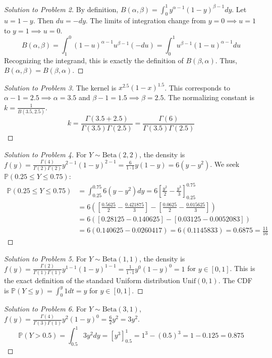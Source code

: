 \documentclass[11pt, a4paper]{article}
\theoremstyle{definition}
\theoremstyle{remark}
\newcommand{\Prob}{\mathbb{P}}
\begin{document}
\begin{proof}[Solution to Problem 2]
By definition, $B(\alpha, \beta) = \int_0^1 y^{\alpha-1} (1-y)^{\beta-1} dy$.
Let $u = 1 - y$. Then $du = -dy$. The limits of integration change from $y=0 \implies u=1$ to $y=1 \implies u=0$.
\[
B(\alpha, \beta) = \int_1^0 (1-u)^{\alpha-1} u^{\beta-1} (-du) = \int_0^1 u^{\beta-1} (1-u)^{\alpha-1} du
\]
Recognizing the integrand, this is exactly the definition of $B(\beta, \alpha)$. Thus, $B(\alpha, \beta) = B(\beta, \alpha)$.
\end{proof}

\begin{proof}[Solution to Problem 3]
The kernel is $x^{2.5} (1-x)^{1.5}$. This corresponds to $\alpha - 1 = 2.5 \implies \alpha = 3.5$ and $\beta - 1 = 1.5 \implies \beta = 2.5$.
The normalizing constant is $k = \frac{1}{B(3.5, 2.5)}$.
\[
k = \frac{\Gamma(3.5 + 2.5)}{\Gamma(3.5)\Gamma(2.5)} = \frac{\Gamma(6)}{\Gamma(3.5)\Gamma(2.5)}
\]
\end{proof}

\begin{proof}[Solution to Problem 4]
For $Y \sim \text{Beta}(2, 2)$, the density is $f(y) = \frac{\Gamma(4)}{\Gamma(2)\Gamma(2)} y^{2-1}(1-y)^{2-1} = \frac{6}{1 \cdot 1} y(1-y) = 6(y - y^2)$.
We seek $\Prob(0.25 \le Y \le 0.75)$:
\begin{align*}
\Prob(0.25 \le Y \le 0.75) &= \int_{0.25}^{0.75} 6(y - y^2) dy = 6 \left[ \frac{y^2}{2} - \frac{y^3}{3} \right]_{0.25}^{0.75} \\
&= 6 \left( \left[ \frac{0.5625}{2} - \frac{0.421875}{3} \right] - \left[ \frac{0.0625}{2} - \frac{0.015625}{3} \right] \right) \\
&= 6 \left( [0.28125 - 0.140625] - [0.03125 - 0.0052083] \right) \\
&= 6 (0.140625 - 0.0260417) = 6 (0.1145833) = 0.6875 = \frac{11}{16}
\end{align*}
\end{proof}

\begin{proof}[Solution to Problem 5]
For $Y \sim \text{Beta}(1, 1)$, the density is $f(y) = \frac{\Gamma(2)}{\Gamma(1)\Gamma(1)} y^{1-1}(1-y)^{1-1} = \frac{1}{1 \cdot 1} y^0 (1-y)^0 = 1$ for $y \in [0, 1]$.
This is the exact definition of the standard Uniform distribution $\text{Unif}(0, 1)$.
The CDF is $\Prob(Y \le y) = \int_0^y 1 dt = y$ for $y \in [0, 1]$.
\end{proof}

\begin{proof}[Solution to Problem 6]
For $Y \sim \text{Beta}(3, 1)$, $f(y) = \frac{\Gamma(4)}{\Gamma(3)\Gamma(1)} y^2 (1-y)^0 = \frac{6}{2} y^2 = 3y^2$.
\[
\Prob(Y > 0.5) = \int_{0.5}^1 3y^2 dy = \left[ y^3 \right]_{0.5}^1 = 1^3 - (0.5)^3 = 1 - 0.125 = 0.875
\]
\end{proof}
\end{document}
